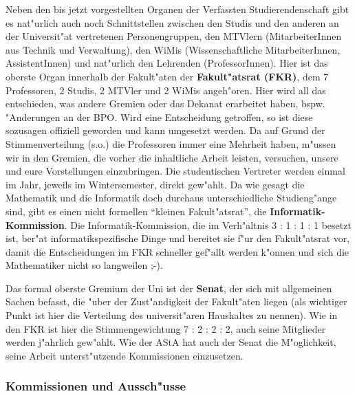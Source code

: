 Neben den bis jetzt vorgestellten Organen der Verfassten Studierendenschaft 
gibt es nat"urlich auch noch Schnittstellen zwischen den Studis und den anderen 
an der Universit"at vertretenen Personengruppen, den MTVlern (MitarbeiterInnen 
aus Technik und Verwaltung), den WiMis (Wissenschaftliche MitarbeiterInnen, 
AssistentInnen) und nat"urlich den Lehrenden (ProfessorInnen). Hier ist das 
oberste Organ innerhalb der Fakult"aten der \textbf{Fakult"atsrat (FKR)}, 
dem 7 Professoren, 2 Studis, 2 MTVler und 2 WiMis angeh"oren. Hier wird all das 
entschieden, was andere Gremien oder das Dekanat erarbeitet haben, bspw. 
"Anderungen an der BPO. Wird eine Entscheidung getroffen, so ist diese 
sozusagen offiziell geworden und kann umgesetzt werden. Da auf Grund der 
Stimmenverteilung (s.o.) die Professoren immer eine Mehrheit haben, m"ussen wir 
in den Gremien, die vorher die inhaltliche Arbeit leisten, versuchen, unsere 
und eure Vorstellungen einzubringen. Die studentischen 
Vertreter werden einmal im Jahr, jeweils im Wintersemester, direkt gew"ahlt. Da 
wie gesagt die Mathematik und die Informatik doch durchaus unterschiedliche 
Studieng"ange sind, gibt es einen nicht formellen "`kleinen Fakult"atsrat"', 
die \textbf{Informatik-Kommission}. Die Informatik-Kommission, die im 
Verh"altnis 3 : 1 : 1 : 1 besetzt ist, ber"at informatikspezifische Dinge und 
bereitet sie f"ur den Fakult"atsrat vor, damit die Entscheidungen im FKR 
schneller gef"allt werden k"onnen und sich die Mathematiker nicht so langweilen 
;-).

Das formal oberste Gremium der Uni ist der \textbf{Senat}, der sich mit 
allgemeinen Sachen befasst, die "uber der Zust"andigkeit der Fakult"aten 
liegen (als wichtiger Punkt ist hier die Verteilung des universit"aren 
Haushaltes zu nennen). Wie in den FKR ist hier die Stimmengewichtung 7 : 2 : 2 
: 2, auch seine Mitglieder werden j"ahrlich gew"ahlt. Wie der AStA hat auch der 
Senat die M"oglichkeit, seine Arbeit unterst"utzende Kommissionen einzusetzen.

\subsubsection*{Kommissionen und Aussch"usse}

